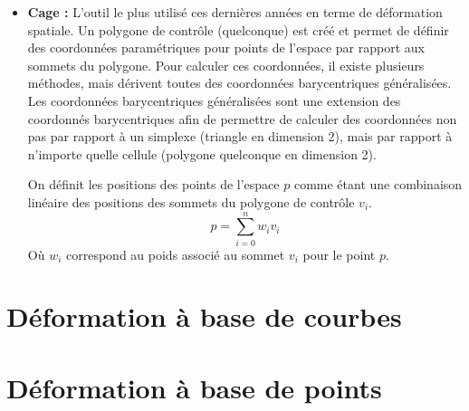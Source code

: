 \begin{itemize}
\item{\textbf{Cage :}} L'outil le plus utilisé ces dernières années en
  terme de déformation spatiale. Un polygone de contrôle (quelconque)
  est créé et permet de définir des coordonnées paramétriques pour
  points de l'espace par rapport aux sommets du polygone. Pour
  calculer ces coordonnées, il existe plusieurs méthodes, mais
  dérivent toutes des coordonnées barycentriques généralisées. Les
  coordonnées barycentriques généralisées sont une extension des
  coordonnés barycentriques afin de permettre de calculer des
  coordonnées non pas par rapport à un simplexe (triangle en dimension
  2), mais par rapport à n'importe quelle cellule (polygone quelconque
  en dimension 2).

  On définit les positions des points de l'espace $p$ comme étant une
  combinaison linéaire des positions des sommets du polygone de
  contrôle $v_i$.
  \begin{equation}
    p = \sum_{i=0}^n w_iv_i
  \end{equation}
  Où $w_i$ correspond au poids associé au sommet $v_i$ pour le point
  $p$.
\end{itemize}

\section{Déformation à base de courbes}

\section{Déformation à base de points}

